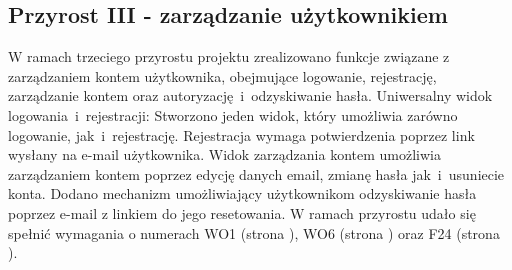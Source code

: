     \subsection{Przyrost III - zarządzanie użytkownikiem}
    \label{sec:przyrost3}
    W ramach trzeciego przyrostu projektu zrealizowano funkcje związane z zarządzaniem kontem użytkownika, obejmujące logowanie, rejestrację, zarządzanie kontem oraz autoryzację~i~odzyskiwanie hasła. \newline
    \indent Uniwersalny widok logowania~i~rejestracji: Stworzono jeden widok, który umożliwia zarówno logowanie, jak~i~rejestrację. Rejestracja wymaga potwierdzenia poprzez link wysłany na e-mail użytkownika. \newline
    \indent Widok zarządzania kontem umożliwia zarządzaniem kontem poprzez edycję danych email, zmianę hasła jak~i~usuniecie konta. \newline 
    \indent Dodano mechanizm umożliwiający użytkownikom odzyskiwanie hasła poprzez e-mail z linkiem do jego resetowania.
    W ramach przyrostu udało się spełnić wymagania o numerach WO1 (strona \pageref{tab:requirements:general1}), WO6 (strona \pageref{tab:requirements:general6}) oraz F24 (strona \pageref{tab:requirements:func24}).





